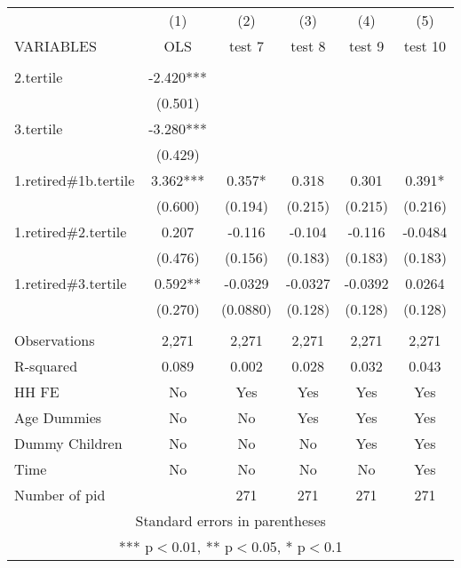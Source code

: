 \begin{tabular}{lccccc} \hline
 & (1) & (2) & (3) & (4) & (5) \\
VARIABLES & OLS & test 7 & test 8 & test 9 & test 10 \\ \hline
 &  &  &  &  &  \\
2.tertile & -2.420*** &  &  &  &  \\
 & (0.501) &  &  &  &  \\
3.tertile & -3.280*** &  &  &  &  \\
 & (0.429) &  &  &  &  \\
1.retired\#1b.tertile & 3.362*** & 0.357* & 0.318 & 0.301 & 0.391* \\
 & (0.600) & (0.194) & (0.215) & (0.215) & (0.216) \\
1.retired\#2.tertile & 0.207 & -0.116 & -0.104 & -0.116 & -0.0484 \\
 & (0.476) & (0.156) & (0.183) & (0.183) & (0.183) \\
1.retired\#3.tertile & 0.592** & -0.0329 & -0.0327 & -0.0392 & 0.0264 \\
 & (0.270) & (0.0880) & (0.128) & (0.128) & (0.128) \\
 &  &  &  &  &  \\
Observations & 2,271 & 2,271 & 2,271 & 2,271 & 2,271 \\
R-squared & 0.089 & 0.002 & 0.028 & 0.032 & 0.043 \\
HH FE & No & Yes & Yes & Yes & Yes \\
Age Dummies & No & No & Yes & Yes & Yes \\
Dummy Children & No & No & No & Yes & Yes \\
Time & No & No & No & No & Yes \\
 Number of pid &  & 271 & 271 & 271 & 271 \\ \hline
\multicolumn{6}{c}{ Standard errors in parentheses} \\
\multicolumn{6}{c}{ *** p$<$0.01, ** p$<$0.05, * p$<$0.1} \\
\end{tabular}
